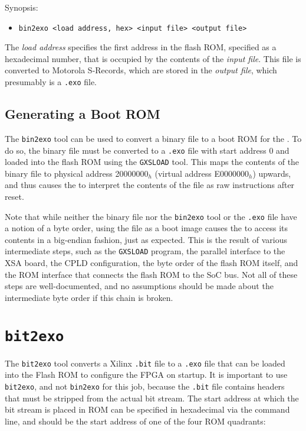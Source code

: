 Synopsis:
\begin{itemize}
\item[] {\tt bin2exo <load address, hex> <input file> <output file>}
\end{itemize}

The {\it load address} specifies the first address in the flash ROM, specified as a hexadecimal number, that is occupied by the contents of the {\it input file}. This file is converted to Motorola S-Records, which are stored in the {\it output file}, which presumably is a {\tt .exo} file.

\subsection{Generating a Boot ROM}

The {\tt bin2exo} tool can be used to convert a binary file to a boot ROM for the \ecox. To do so, the binary file must be converted to a {\tt .exo} file with start address 0 and loaded into the flash ROM using the {\tt GXSLOAD} tool. This maps the contents of the binary file to physical address 20000000$_h$ (virtual address E0000000$_h$) upwards, and thus causes the \eco to interpret the contents of the file as raw instructions after reset.

Note that while neither the binary file nor the {\tt bin2exo} tool or the {\tt .exo} file have a notion of a byte order, using the file as a boot image causes the \eco to access its contents in a big-endian fashion, just as expected. This is the result of various intermediate steps, such as the {\tt GXSLOAD} program, the parallel interface to the XSA board, the CPLD configuration, the byte order of the flash ROM itself, and the ROM interface that connects the flash ROM to the SoC bus. Not all of these steps are well-documented, and no assumptions should be made about the intermediate byte order if this chain is broken.

\section{\tt bit2exo}

The {\tt bit2exo} tool converts a Xilinx {\tt .bit} file to a {\tt .exo} file that can be loaded into the Flash ROM to configure the FPGA on startup. It is important to use {\tt bit2exo}, and not {\tt bin2exo} for this job, because the {\tt .bit} file contains headers that must be stripped from the actual bit stream. The start address at which the bit stream is placed in ROM can be specified in hexadecimal via the command line, and should be the start address of one of the four ROM quadrants:

